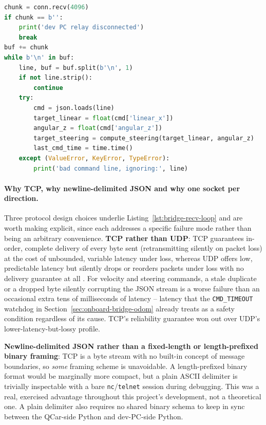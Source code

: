\begin{lstlisting}[language=Python,caption={Newline-delimited JSON command parsing inside \texttt{qcar\_bridge.py}'s main loop.},label={lst:bridge-recv-loop}]
chunk = conn.recv(4096)
if chunk == b'':
    print('dev PC relay disconnected')
    break
buf += chunk
while b'\n' in buf:
    line, buf = buf.split(b'\n', 1)
    if not line.strip():
        continue
    try:
        cmd = json.loads(line)
        target_linear = float(cmd['linear_x'])
        angular_z = float(cmd['angular_z'])
        target_steering = compute_steering(target_linear, angular_z)
        last_cmd_time = time.time()
    except (ValueError, KeyError, TypeError):
        print('bad command line, ignoring:', line)
\end{lstlisting}

\paragraph{Why TCP, why newline-delimited JSON and why one socket per direction.}
Three protocol design choices underlie Listing~\ref{lst:bridge-recv-loop}
and are worth making explicit, since each addresses a specific
failure mode rather than being an arbitrary convenience. \textbf{TCP rather than UDP}: TCP guarantees in-order, complete
delivery of every byte sent (retransmitting silently on packet loss)
at the cost of unbounded, variable latency under loss, whereas UDP
offers low, predictable latency but silently drops or reorders
packets under loss with no delivery guarantee at all
\cite{rfc793tcp,rfc768udp}. For velocity
and steering commands, a stale duplicate or a dropped byte silently
corrupting the JSON stream is a worse failure than an occasional
extra tens of milliseconds of latency -- latency that the
\texttt{CMD\_TIMEOUT} watchdog in Section~\ref{sec:onboard-bridge-odom}
already treats as a safety condition regardless of its cause. TCP's
reliability guarantee won out over UDP's
lower-latency-but-lossy profile.

\textbf{Newline-delimited JSON rather than a fixed-length or
length-prefixed binary framing}: TCP is a byte stream with no
built-in concept of message boundaries, so \emph{some} framing scheme
is unavoidable. A length-prefixed binary format would be marginally
more compact, but a plain ASCII delimiter is trivially inspectable
with a bare \texttt{nc}/\texttt{telnet} session during debugging.
This was a real, exercised advantage throughout this project's
development, not a theoretical one. A plain delimiter also requires
no shared binary schema to keep in sync between the QCar-side Python
and dev-PC-side Python.

